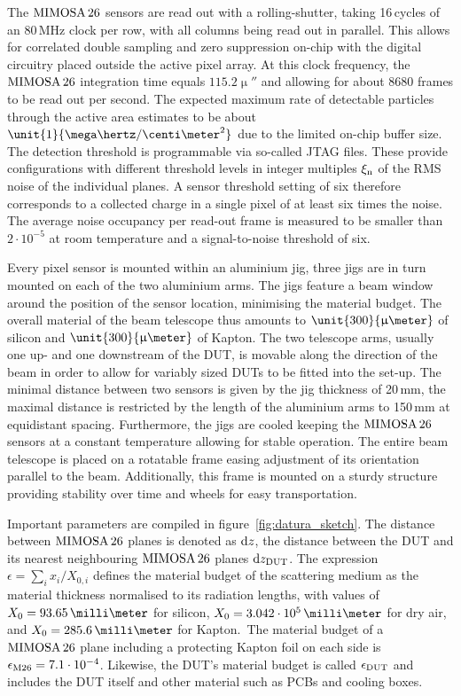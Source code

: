 The $\textrm{MIMOSA\,26}$ sensors are read out with a rolling-shutter, taking 16\,cycles of an 80\,MHz clock per row, with all columns being read out in parallel. 
This allows for correlated double sampling and zero suppression on-chip with the digital circuitry placed outside the active pixel array. 
At this clock frequency, the $\textrm{MIMOSA\,26}$ integration time equals $\unit{115.2}{\upmu\second}$ and allowing for about 8680 frames to be read out per second. 
The expected maximum rate of detectable particles through the active area estimates to be about $\unit{1}{\mega\hertz/\centi\meter^2}$ due to the limited on-chip buffer size. 
The detection threshold is programmable via so-called JTAG files. 
These provide configurations with different threshold levels in integer multiples $\xi_{\textrm{n}}$ of the RMS noise of the individual planes. 
A sensor threshold setting of six therefore corresponds to a collected charge in a single pixel of at least six times the noise. 
The average noise occupancy per read-out frame is measured to be smaller than $2\cdot10^{-5}$ at room temperature and a signal-to-noise threshold of six.

Every pixel sensor is mounted within an aluminium jig, three jigs are in turn mounted on each of the two aluminium arms. 
The jigs feature a beam window around the position of the sensor location, minimising the material budget. 
The overall material of the beam telescope thus amounts to $\unit{300}{\upmu\meter}$ of silicon and $\unit{300}{\upmu\meter}$ of Kapton. 
The two telescope arms, usually one up- and one downstream of the DUT, is movable along the direction of the beam in order to allow for variably sized DUTs to be fitted into the set-up. 
The minimal distance between two sensors is given by the jig thickness of 20\,mm, the maximal distance is restricted by the length of the aluminium arms to 150\,mm at equidistant spacing.
Furthermore, the jigs are cooled keeping the $\textrm{MIMOSA\,26}$ sensors at a constant temperature allowing for stable operation.
The entire beam telescope is placed on a rotatable frame easing adjustment of its orientation parallel to the beam. 
Additionally, this frame is mounted on a sturdy structure providing stability over time and wheels for easy transportation. 

Important parameters are compiled in figure~\ref{fig:datura_sketch}. 
The distance between $\textrm{MIMOSA\,26}$ planes is denoted as $\textrm{d}z$, the distance between the DUT and its nearest neighbouring $\textrm{MIMOSA\,26}$ planes $\textrm{d}z_{\textrm{DUT}}$. 
The expression $\epsilon = \sum_i x_{i}/X_{0,i}$ defines the material budget of the scattering medium as the material thickness normalised to its radiation lengths,
 with values of $X_0 = 93.65\,\milli\meter$ for silicon, $X_0 = 3.042\cdot 10^{5}\,\milli\meter$ for dry air, and $X_0 = 285.6\,\milli\meter$ for Kapton.\,\cite{ref:x0values}
The material budget of a $\textrm{MIMOSA\,26}$ plane including a protecting Kapton foil on each side is $\mathnormal{\epsilon_{\textrm{M26}}} = 7.1\cdot10^{-4}$. 
Likewise, the DUT's material budget is called $\mathnormal{\epsilon_{\textrm{DUT}}}$ and includes the DUT itself and other material such as PCBs and cooling boxes.


